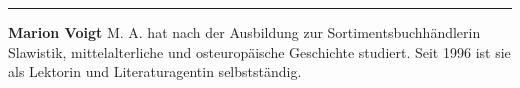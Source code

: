 \begin{center}\rule{3in}{0.4pt}\end{center}

\textbf{Marion Voigt} M. A. hat nach der Ausbildung zur
Sortimentsbuchhändlerin Slawistik, mittelalterliche und osteuropäische
Geschichte studiert. Seit 1996 ist sie als Lektorin und Literaturagentin
selbstständig.

